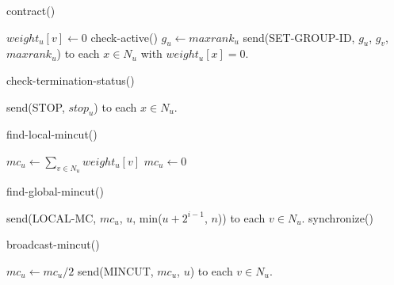 \documentclass{acm_proc_article-sp}
\begin{document}
\begin{algorithm}                      \caption{contract()}   \label{alg15}                           \begin{algorithmic}
\STATE $weight_{u}[v] \leftarrow 0$
\STATE check-active()
\STATE $g_{u}\leftarrow maxrank_{u}$
\STATE send(SET-GROUP-ID, $g_{u}$, $g_{v}$, $maxrank_{u}$) to each $x \in N_{u}$ with $weight_{u}[x]=0$. 
\ENDIF
\end{algorithmic}
\end{algorithm}

\begin{algorithm}                      \caption{check-termination-status()}   \label{alg7}                           \begin{algorithmic}
\STATE send(STOP, $stop_{u}$) to each $x\in N_{u}$. 
\end{algorithmic}
\end{algorithm}

\begin{algorithm}                      \caption{find-local-mincut()}   \label{alg8}                           \begin{algorithmic}
\STATE $mc_{u}\leftarrow \sum_{v\in N_{u}}{weight_{u}[v]}$
\ELSE
\STATE $mc_{u}\leftarrow 0$
\ENDIF
\end{algorithmic}
\end{algorithm}

\begin{algorithm}                      \caption{find-global-mincut()}   \label{alg9}                           \begin{algorithmic}
\STATE send(LOCAL-MC, $mc_{u}$, $u$, min($u+2^{i-1}$, $n$)) to each $v\in N_{u}$. 
\ENDIF
\STATE synchronize()
\ENDFOR
\ENDFOR
\end{algorithmic}
\end{algorithm}

\begin{algorithm}                      \caption{broadcast-mincut()}   \label{alg10}                           \begin{algorithmic}
\STATE $mc_{u}\leftarrow mc_{u} / 2$
\STATE send(MINCUT, $mc_{u}$, $u$) to each $v\in N_{u}$. 
\ENDIF
\end{algorithmic}
\end{algorithm}
\end{document}
